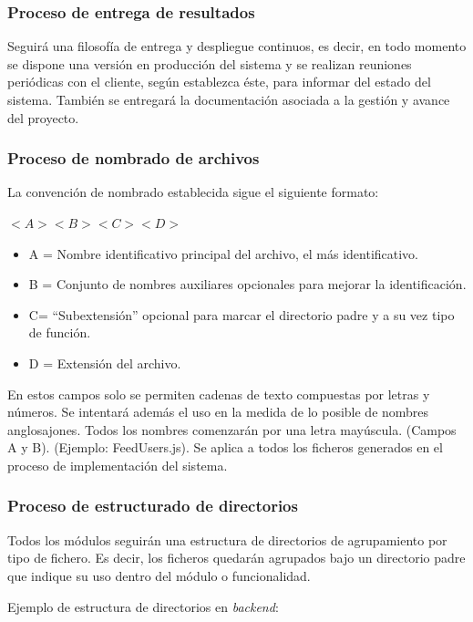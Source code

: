 \documentclass{article}
\begin{document}
\subsubsection{Proceso de entrega de resultados} \label{P.EC.7}
Seguirá una filosofía de entrega y despliegue continuos, es decir, en todo momento se dispone una versión en producción del sistema y se realizan reuniones periódicas con el cliente, según establezca éste, para informar del estado del sistema. También se entregará la documentación asociada a la gestión y avance del proyecto.

\subsubsection{Proceso de nombrado de archivos} \label{P.EC.8}

La convención de nombrado establecida sigue el siguiente formato:

$<A><B><C><D>$

\begin{itemize}
   \setlength{\itemsep}{0em} %
   \item A = Nombre identificativo principal del archivo, el más identificativo.
   \item B = Conjunto de nombres auxiliares opcionales para mejorar la identificación.
   \item C= “Subextensión” opcional para marcar el directorio padre y a su vez tipo de función.
   \item D = Extensión del archivo.
\end{itemize}

En estos campos solo se permiten cadenas de texto compuestas por letras y números. Se intentará además el uso en la medida de lo posible de nombres anglosajones. Todos los nombres comenzarán por una letra mayúscula. (Campos A y B). (Ejemplo: FeedUsers.js). Se aplica a todos los ficheros generados en el proceso de implementación del sistema.

\subsubsection{Proceso de estructurado de directorios} \label{P.EC.9}

Todos los módulos seguirán una estructura de directorios de agrupamiento por tipo de fichero. Es decir, los ficheros quedarán agrupados bajo un directorio padre que indique su uso dentro del módulo o funcionalidad.

Ejemplo de estructura de directorios en \textit{backend}:
\end{document}
